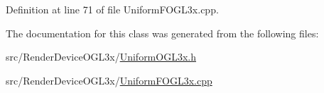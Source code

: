 Definition at line 71 of file Uniform\-F\-O\-G\-L3x.\-cpp.



The documentation for this class was generated from the following files\-:\begin{DoxyCompactItemize}
\item 
src/\-Render\-Device\-O\-G\-L3x/\hyperlink{_uniform_o_g_l3x_8h}{Uniform\-O\-G\-L3x.\-h}\item 
src/\-Render\-Device\-O\-G\-L3x/\hyperlink{_uniform_f_o_g_l3x_8cpp}{Uniform\-F\-O\-G\-L3x.\-cpp}\end{DoxyCompactItemize}
